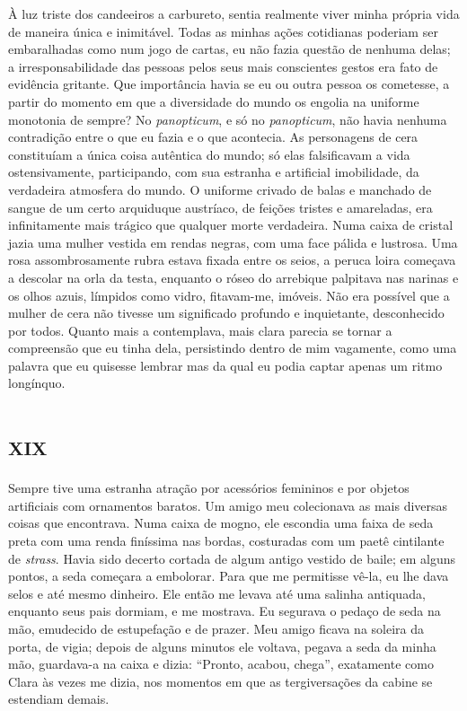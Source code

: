 À luz triste dos candeeiros a carbureto, sentia realmente viver minha própria vida de maneira única e inimitável. Todas as minhas ações cotidianas poderiam ser embaralhadas como num jogo de cartas, eu não fazia questão de nenhuma delas; a irresponsabilidade das pessoas pelos seus mais conscientes gestos era fato de evidência gritante. Que importância havia se eu ou outra pessoa os cometesse, a partir do momento em que a diversidade do mundo os engolia na uniforme monotonia de sempre? No \textit{panopticum}, e só no \textit{panopticum}, não havia nenhuma contradição entre o que eu fazia e o que acontecia. As personagens de cera constituíam a única coisa autêntica do mundo; só elas falsificavam a vida ostensivamente, participando, com sua estranha e artificial imobilidade, da verdadeira atmosfera do mundo. O uniforme crivado de balas e manchado de sangue de um certo arquiduque austríaco, de feições tristes e amareladas, era infinitamente mais trágico que qualquer morte verdadeira. Numa caixa de cristal jazia uma mulher vestida em rendas negras, com uma face pálida e lustrosa. Uma rosa assombrosamente rubra estava fixada entre os seios, a peruca loira começava a descolar na orla da testa, enquanto o róseo do arrebique palpitava nas narinas e os olhos azuis, límpidos como vidro, fitavam-me, imóveis. Não era possível que a mulher de cera não tivesse um significado profundo e inquietante, desconhecido por todos. Quanto mais a contemplava, mais clara parecia se tornar a compreensão que eu tinha dela, persistindo dentro de mim vagamente, como uma palavra que eu quisesse lembrar mas da qual eu podia captar apenas um ritmo longínquo.


\chapter*{\huge\centering\textsc{xix}}

Sempre tive uma estranha atração por acessórios femininos e por objetos artificiais com ornamentos baratos. Um amigo meu colecionava as mais diversas coisas que encontrava. Numa caixa de mogno, ele escondia uma faixa de seda preta com uma renda finíssima nas bordas, costuradas com um paetê cintilante de \textit{strass}. Havia sido decerto cortada de algum antigo vestido de baile; em alguns pontos, a seda começara a embolorar. Para que me permitisse vê-la, eu lhe dava selos e até mesmo dinheiro. Ele então me levava até uma salinha antiquada, enquanto seus pais dormiam, e me mostrava. Eu segurava o pedaço de seda na mão, emudecido de estupefação e de prazer. Meu amigo ficava na soleira da porta, de vigia; depois de alguns minutos ele voltava, pegava a seda da minha mão, guardava-a na caixa e dizia: ``Pronto, acabou, chega'', exatamente como Clara às vezes me dizia, nos momentos em que as tergiversações da cabine se estendiam demais.

